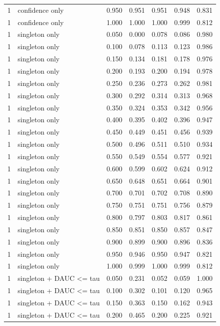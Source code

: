 \begin{tabular}{rlrrrrr}
1 & confidence only & 0.950 & 0.951 & 0.951 & 0.948 & 0.831 \\
1 & confidence only & 1.000 & 1.000 & 1.000 & 0.999 & 0.812 \\
1 & singleton only & 0.050 & 0.000 & 0.078 & 0.086 & 0.980 \\
1 & singleton only & 0.100 & 0.078 & 0.113 & 0.123 & 0.986 \\
1 & singleton only & 0.150 & 0.134 & 0.181 & 0.178 & 0.976 \\
1 & singleton only & 0.200 & 0.193 & 0.200 & 0.194 & 0.978 \\
1 & singleton only & 0.250 & 0.236 & 0.273 & 0.262 & 0.981 \\
1 & singleton only & 0.300 & 0.292 & 0.314 & 0.313 & 0.968 \\
1 & singleton only & 0.350 & 0.324 & 0.353 & 0.342 & 0.956 \\
1 & singleton only & 0.400 & 0.395 & 0.402 & 0.396 & 0.947 \\
1 & singleton only & 0.450 & 0.449 & 0.451 & 0.456 & 0.939 \\
1 & singleton only & 0.500 & 0.496 & 0.511 & 0.510 & 0.934 \\
1 & singleton only & 0.550 & 0.549 & 0.554 & 0.577 & 0.921 \\
1 & singleton only & 0.600 & 0.599 & 0.602 & 0.624 & 0.912 \\
1 & singleton only & 0.650 & 0.648 & 0.651 & 0.664 & 0.901 \\
1 & singleton only & 0.700 & 0.701 & 0.702 & 0.708 & 0.890 \\
1 & singleton only & 0.750 & 0.751 & 0.751 & 0.756 & 0.879 \\
1 & singleton only & 0.800 & 0.797 & 0.803 & 0.817 & 0.861 \\
1 & singleton only & 0.850 & 0.851 & 0.850 & 0.857 & 0.847 \\
1 & singleton only & 0.900 & 0.899 & 0.900 & 0.896 & 0.836 \\
1 & singleton only & 0.950 & 0.946 & 0.950 & 0.947 & 0.821 \\
1 & singleton only & 1.000 & 0.999 & 1.000 & 0.999 & 0.812 \\
1 & singleton + DAUC <= tau & 0.050 & 0.231 & 0.052 & 0.059 & 1.000 \\
1 & singleton + DAUC <= tau & 0.100 & 0.302 & 0.101 & 0.120 & 0.965 \\
1 & singleton + DAUC <= tau & 0.150 & 0.363 & 0.150 & 0.162 & 0.943 \\
1 & singleton + DAUC <= tau & 0.200 & 0.465 & 0.200 & 0.225 & 0.921 \\

\end{tabular}
